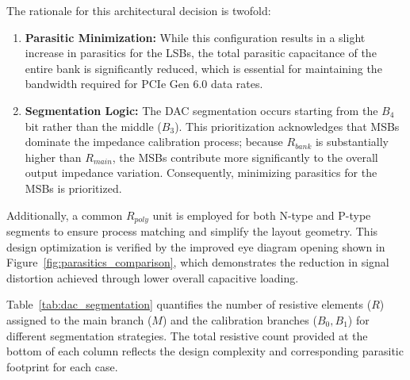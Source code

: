The rationale for this architectural decision is twofold:
\begin{enumerate}
    \item \textbf{Parasitic Minimization:} While this configuration results in a slight increase in parasitics for the LSBs, the total parasitic capacitance of the entire bank is significantly reduced, which is essential for maintaining the bandwidth required for PCIe Gen 6.0 data rates.
    \item \textbf{Segmentation Logic:} The DAC segmentation occurs starting from the $B_4$ bit rather than the middle ($B_3$). This prioritization acknowledges that MSBs dominate the impedance calibration process; because $R_{bank}$ is substantially higher than $R_{main}$, the MSBs contribute more significantly to the overall output impedance variation. Consequently, minimizing parasitics for the MSBs is prioritized.
\end{enumerate}

Additionally, a common $R_{poly}$ unit is employed for both N-type and P-type segments to ensure process matching and simplify the layout geometry. This design optimization is verified by the improved eye diagram opening shown in Figure~\ref{fig:parasitics_comparison}, which demonstrates the reduction in signal distortion achieved through lower overall capacitive loading.
\newline


Table~\ref{tab:dac_segmentation} quantifies the number of resistive elements ($R$) assigned to the main branch ($M$) and the calibration branches ($B_0, B_1$) for different segmentation strategies. The total resistive count provided at the bottom of each column reflects the design complexity and corresponding parasitic footprint for each case.

